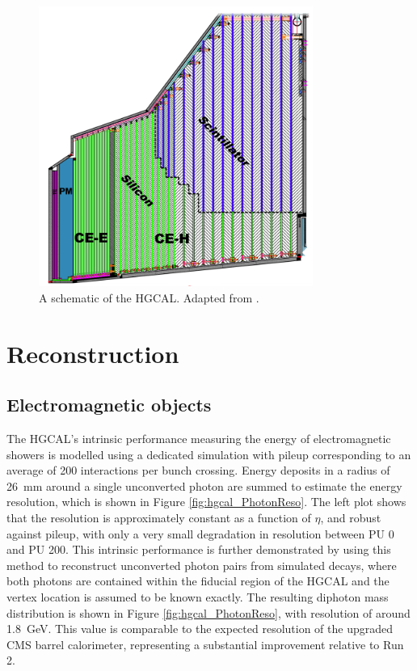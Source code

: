 \begin{figure}[h!]
  \centering
  \includegraphics[width=0.8\textwidth]{Figures/HGCAL/TheHGCAL.png}
  \caption{A schematic of the HGCAL. Adapted from \cite{HGCAL}.}
  \label{fig:hgcal_TheHGCAL}
\end{figure}

\section{Reconstruction}

\subsection{Electromagnetic objects}

The HGCAL's intrinsic performance measuring the energy of electromagnetic showers is modelled using a dedicated simulation with pileup corresponding to an average of 200 interactions per bunch crossing. 
Energy deposits in a radius of \SI{26}{mm} around a single unconverted photon are summed to estimate the energy resolution, which is shown in Figure \ref{fig:hgcal_PhotonReso}.
The left plot shows that the resolution is approximately constant as a function of $\eta$, and robust against pileup, with only a very small degradation in resolution between PU 0 and PU 200.
This intrinsic performance is further demonstrated by using this method to reconstruct unconverted photon pairs from simulated \Hgg decays, 
where both photons are contained within the fiducial region of the HGCAL and the vertex location is assumed to be known exactly. 
The resulting diphoton mass distribution is shown in Figure \ref{fig:hgcal_PhotonReso}, with resolution of around \SI{1.8}{GeV}.
This value is comparable to the expected resolution of the upgraded CMS barrel calorimeter, representing a substantial improvement relative to Run 2. 

